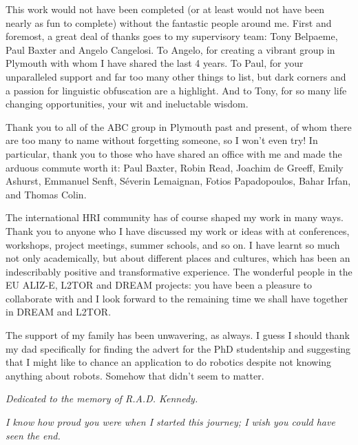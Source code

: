 This work would not have been completed (or at least would not have been nearly as fun to complete) without the fantastic people around me. First and foremost, a great deal of thanks goes to my supervisory team: Tony Belpaeme, Paul Baxter and Angelo Cangelosi. To Angelo, for creating a vibrant group in Plymouth with whom I have shared the last 4 years. To Paul, for your unparalleled support and far too many other things to list, but dark corners and a passion for linguistic obfuscation are a highlight. And to Tony, for so many life changing opportunities, your wit and ineluctable wisdom.

Thank you to all of the ABC group in Plymouth past and present, of whom there are too many to name without forgetting someone, so I won't even try! In particular, thank you to those who have shared an office with me and made the arduous commute worth it: Paul Baxter, Robin Read, Joachim de Greeff, Emily Ashurst, Emmanuel Senft, S\'{e}verin Lemaignan, Fotios Papadopoulos, Bahar Irfan, and Thomas Colin.

The international HRI community has of course shaped my work in many ways. Thank you to anyone who I have discussed my work or ideas with at conferences, workshops, project meetings, summer schools, and so on. I have learnt so much not only academically, but about different places and cultures, which has been an indescribably positive and transformative experience. The wonderful people in the EU ALIZ-E, L2TOR and DREAM projects: you have been a pleasure to collaborate with and I look forward to the remaining time we shall have together in DREAM and L2TOR.

The support of my family has been unwavering, as always. I guess I should thank my dad specifically for finding the advert for the PhD studentship and suggesting that I might like to chance an application to do robotics despite not knowing anything about robots. Somehow that didn't seem to matter.

\vspace{4em}

\textit{Dedicated to the memory of R.A.D. Kennedy.}

\vspace{0.7em}
\textit{I know how proud you were when I started this journey; I wish you could have seen the end.}